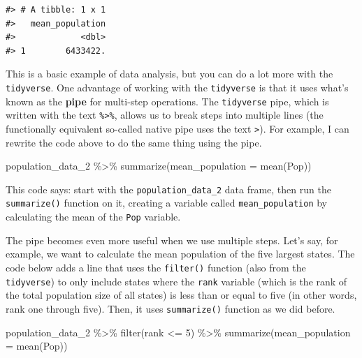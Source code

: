 \documentclass[
]{book}
\newenvironment{Shaded}{\begin{snugshade}}{\end{snugshade}}
\newcommand{\AttributeTok}[1]{\textcolor[rgb]{0.77,0.63,0.00}{#1}}
\newcommand{\DecValTok}[1]{\textcolor[rgb]{0.00,0.00,0.81}{#1}}
\newcommand{\FunctionTok}[1]{\textcolor[rgb]{0.00,0.00,0.00}{#1}}
\newcommand{\NormalTok}[1]{#1}
\newcommand{\SpecialCharTok}[1]{\textcolor[rgb]{0.00,0.00,0.00}{#1}}
\begin{document}
\begin{verbatim}
#> # A tibble: 1 x 1
#>   mean_population
#>             <dbl>
#> 1        6433422.
\end{verbatim}

This is a basic example of data analysis, but you can do a lot more with the \texttt{tidyverse}. One advantage of working with the \texttt{tidyverse} is that it uses what's known as the \textbf{pipe} for multi-step operations. The \texttt{tidyverse} pipe, which is written with the text \texttt{\%\textgreater{}\%}, allows us to break steps into multiple lines (the functionally equivalent so-called native pipe uses the text \texttt{\textbar{}\textgreater{}}). For example, I can rewrite the code above to do the same thing using the pipe.

\begin{Shaded}
\begin{Highlighting}[]
\NormalTok{population\_data\_2 }\SpecialCharTok{\%\textgreater{}\%} 
  \FunctionTok{summarize}\NormalTok{(}\AttributeTok{mean\_population =} \FunctionTok{mean}\NormalTok{(Pop))}
\end{Highlighting}
\end{Shaded}

This code says: start with the \texttt{population\_data\_2} data frame, then run the \texttt{summarize()} function on it, creating a variable called \texttt{mean\_population} by calculating the mean of the \texttt{Pop} variable.

The pipe becomes even more useful when we use multiple steps. Let's say, for example, we want to calculate the mean population of the five largest states. The code below adds a line that uses the \texttt{filter()} function (also from the \texttt{tidyverse}) to only include states where the \texttt{rank} variable (which is the rank of the total population size of all states) is less than or equal to five (in other words, rank one through five). Then, it uses \texttt{summarize()} function as we did before.

\begin{Shaded}
\begin{Highlighting}[]
\NormalTok{population\_data\_2 }\SpecialCharTok{\%\textgreater{}\%} 
  \FunctionTok{filter}\NormalTok{(rank }\SpecialCharTok{\textless{}=} \DecValTok{5}\NormalTok{) }\SpecialCharTok{\%\textgreater{}\%} 
  \FunctionTok{summarize}\NormalTok{(}\AttributeTok{mean\_population =} \FunctionTok{mean}\NormalTok{(Pop))}
\end{Highlighting}
\end{Shaded}
\end{document}
